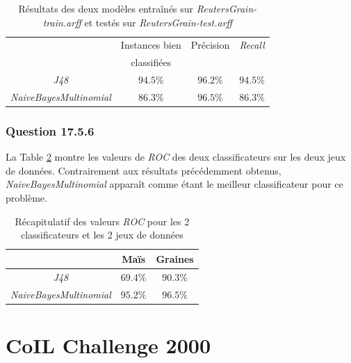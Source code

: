 \documentclass[10pt,a4paper]{article}
\begin{document}
			  \begin{table}[h]
			  	\centering
			  	\caption{Résultats des deux modèles entraînés sur \textit{ReutersGrain-train.arff} et testés sur \textit{ReutersGrain-test.arff}}
			  	\label{tab:grain}
			  	\begin{tabular}{|c|c|c|c|}
			  		\hline
			  		&Instances bien  & Précision & \textit{Recall}\\
			  		& classifiées  &  & \\ 
			  		\hline
			  		\textit{J48} & $94.5 \%$ & $96.2\%$ & $94.5\%$ \\
			  		\hline
			  		\textit{NaiveBayesMultinomial}& $86.3\%$ & $96.5\%$ & $86.3\%$ \\
			  		\hline
			  	\end{tabular}
			  \end{table}
			  
			  \subsubsection*{Question 17.5.6}
			  
			  La Table \ref{tab:text:ROC} montre les valeurs de \textit{ROC} des deux classificateurs sur les deux jeux de données. Contrairement aux résultats précédemment obtenus, \textit{NaiveBayesMultinomial} apparaît comme étant le meilleur classificateur pour ce problème.
			  
			  \begin{table}[h]
			  	\centering
			  	\caption{Récapitulatif des valeurs \textit{ROC} pour les 2 classificateurs et les 2 jeux de données}
			  	\label{tab:text:ROC}
			  	\begin{tabular}{|c|c|c|}
			  		\hline
			  		& Maïs & Graines \\
			  		\hline
			  		\textit{J48} & $69.4\%$ & $90.3\%$\\
			  		\hline
			  		\textit{NaiveBayesMultinomial} & $95.2\%$ & $96.5\%$\\
			  		\hline
			  	\end{tabular}
			  \end{table}
   	
   	\section{CoIL Challenge 2000}
   	
          	
\end{document}
